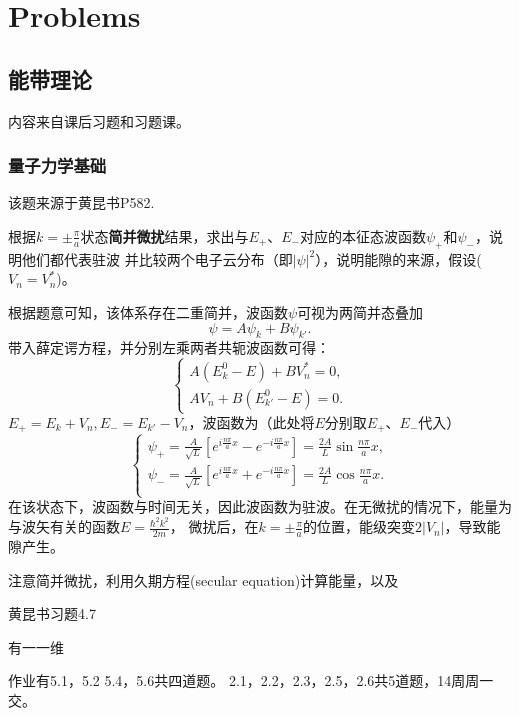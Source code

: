 \chapter{Problems}
\section{能带理论}
内容来自课后习题和习题课。
\subsection{量子力学基础}
    该题来源于黄昆书P582.
    \begin{example}
        根据$k=\pm \frac{\pi}{a}$状态\textbf{简并微扰}结果，求出与$E_+$、$E_-$对应的本征态波函数$\psi_+$和$\psi_-$，说明他们都代表驻波
        并比较两个电子云分布（即$|\psi|^2$），说明能隙的来源，假设($V_n=V_n^*$)。

        根据题意可知，该体系存在二重简并，波函数$\psi$可视为两简并态叠加
        \begin{equation*}
            \psi=A\psi_k+B\psi_{k'}.
        \end{equation*}
        带入薛定谔方程，并分别左乘两者共轭波函数可得：
        \begin{equation*}
            \left\{\begin{aligned}
                A(E_k^0-E)+BV_n^*=0,\\
                AV_n+B(E_{k'}^0-E)=0.
            \end{aligned}\right.
        \end{equation*}
        $E_+=E_k+V_n,E_-=E_{k'}-V_n$，波函数为（此处将$E$分别取$E_+$、$E_-$代入）
        \begin{equation*}
            \left\{
                \begin{aligned}
                    \psi_+=\frac{A}{\sqrt{L}}[e^{i\frac{n\pi}{a}x}-e^{-i\frac{n\pi}{a}x}]=\frac{2A}{L}\sin{\frac{n\pi}{a}x},\\
                    \psi_-=\frac{A}{\sqrt{L}}[e^{i\frac{n\pi}{a}x}+e^{-i\frac{n\pi}{a}x}]=\frac{2A}{L}\cos{\frac{n\pi}{a}x}.\\
                \end{aligned}\right.
        \end{equation*}
        在该状态下，波函数与时间无关，因此波函数为驻波。在无微扰的情况下，能量为与波矢有关的函数$E=\frac{\hbar^2k^2}{2m}$，
        微扰后，在$k=\pm \frac{\pi}{a}$的位置，能级突变$2|V_n|$，导致能隙产生。
        
        注意简并微扰，利用久期方程(secular equation)计算能量，以及 
    \end{example}
    黄昆书习题4.7
    \begin{example}
        有一一维
    \end{example}
    作业有5.1，5.2 5.4，5.6共四道题。
    2.1，2.2，2.3，2.5，2.6共5道题，14周周一交。